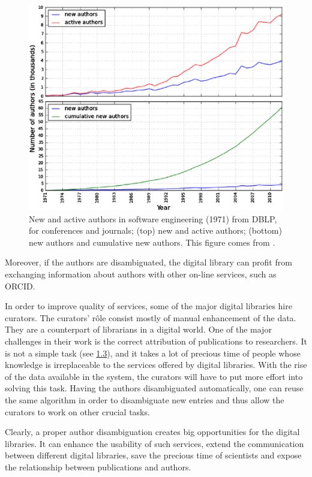 \documentclass{pracamgr}
\newcommand{\myhy}[2]{\hyperref[#1]{#2}}
\begin{document}
\begin{figure}[H]
\includegraphics[width=\textwidth]{figures/fig-rise}
\caption{New and active authors in software engineering (1971) from DBLP,
for conferences and journals; (top) new and active authors; (bottom) new authors and
cumulative new authors. This figure comes from \citep{figurerise}.}
\label{fig:rise}
\end{figure}

Moreover, if the authors are disambiguated, the digital library can profit from exchanging
information about authors with other on-line services, such as ORCID.

In order to improve quality of services, some of the major digital libraries hire curators.
The curators' r\^{o}le consist mostly of manual enhancement of the data. They are a counterpart
of librarians in a digital world. One of the major challenges in their work is the correct
attribution of publications to researchers. It is not a simple task (see
\myhy{sec:unobvious}{1.3}), and it takes a lot of precious time of people whose knowledge is 
irreplaceable to the services offered by digital libraries. With the rise of the data
available in the system, the curators will have to put more effort into solving this task.
Having the authors disambiguated automatically, one can reuse the same algorithm in order to
disambiguate new entries and thus allow the curators to work on other crucial tasks.

Clearly, a proper author disambiguation creates big opportunities for the digital
libraries. It can enhance the usability of such services, extend the communication between
different digital libraries, save the precious time of scientists and expose the
relationship between publications and authors.
\end{document}
